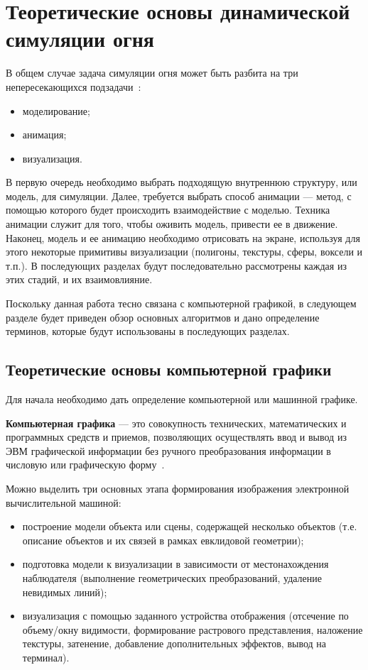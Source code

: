 \chapter{Теоретические основы динамической симуляции огня}

В общем случае задача симуляции огня может быть разбита на три
непересекающихся подзадачи~\cite{Perry94synthesizingflames}:
\begin{itemize}
	\item моделирование;
	\item анимация;
	\item визуализация.
\end{itemize}

В первую очередь необходимо выбрать подходящую внутреннюю структуру, или модель,
для симуляции. Далее, требуется выбрать способ анимации --- метод, с помощью
которого будет происходить взаимодействие с моделью. Техника анимации служит для
того, чтобы оживить модель, привести ее в движение. Наконец, модель и ее
анимацию необходимо отрисовать на экране, используя для этого некоторые
примитивы визуализации (полигоны, текстуры, сферы, воксели и т.п.). В
последующих разделах будут последовательно рассмотрены каждая из этих стадий, и
их взаимовлияние.

Поскольку данная работа тесно связана с компьютерной графикой, в следующем
разделе будет приведен обзор основных алгоритмов и дано определение терминов,
которые будут использованы в последующих разделах.

\section{Теоретические основы компьютерной графики}

Для начала необходимо дать определение компьютерной или машинной графике.

\textbf{Компьютерная графика} --- это совокупность технических, математических и
программных средств и приемов, позволяющих осуществлять ввод и вывод из ЭВМ
графической информации без ручного преобразования информации в числовую или
графическую форму~\cite{SamalGraphics}.

Можно выделить три основных этапа формирования изображения электронной
вычислительной машиной:
\begin{itemize}
    \item построение модели объекта или сцены, содержащей несколько объектов
        (т\@.е\@. описание объектов и их связей в рамках евклидовой геометрии);
    \item подготовка модели к визуализации в зависимости от местонахождения
        наблюдателя (выполнение геометрических преобразований, удаление
        невидимых линий);
    \item визуализация с помощью заданного устройства отображения (отсечение по
        объему/окну видимости, формирование растрового представления, наложение
        текстуры, затенение, добавление дополнительных эффектов, вывод на
        терминал).
\end{itemize}

